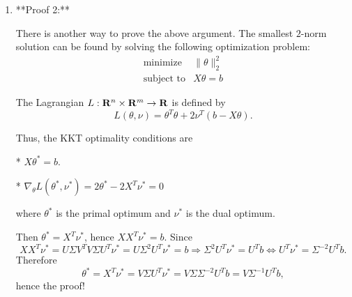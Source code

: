 \begin{enumerate}
\begin{solution}
\begin{enumerate}
\item

**Proof 2:**

There is another way to prove the above argument.
The smallest $2$-norm solution can be found by solving the following optimization problem:
\begin{equation}
\begin{array}{ll}
\mbox{minimize} & \|\theta\|_2^2
\\
\mbox{subject to} & X\theta = b
\end{array}
\end{equation}

The Lagrangian $L:\mathbf{R}^n\times\mathbf{R}^m \to \mathbf{R}$ is defined by
\begin{equation}
L(\theta, \nu) = \theta^T\theta + 2\nu^T(b-X\theta).
\end{equation}

Thus, the KKT optimality conditions are

* $X\theta^\ast = b$.

* $\nabla_\theta L(\theta^\ast, \nu^\ast) = 2\theta^\ast - 2X^T \nu^\ast = 0$

where $\theta^\ast$ is the primal optimum and $\nu^\ast$ is the dual optimum.

Then $\theta^\ast = X^T \nu^\ast$, hence $XX^T \nu^\ast = b$.
Since
\begin{equation}
XX^T \nu^\ast = U\Sigma V^T V \Sigma U^T \nu^\ast = U\Sigma^2 U^T \nu^\ast = b
\Rightarrow
\Sigma^2 U^T \nu^\ast = U^T b
\Leftrightarrow
U^T \nu^\ast = \Sigma^{-2} U^T b.
\end{equation}
Therefore
\begin{equation}
\theta^\ast = X^T \nu^\ast = V \Sigma U^T \nu^\ast = V \Sigma \Sigma^{-2} U^T b = V \Sigma^{-1} U^T b,
\end{equation}
hence the proof!


\end{enumerate}
\end{solution}

\end{enumerate}
